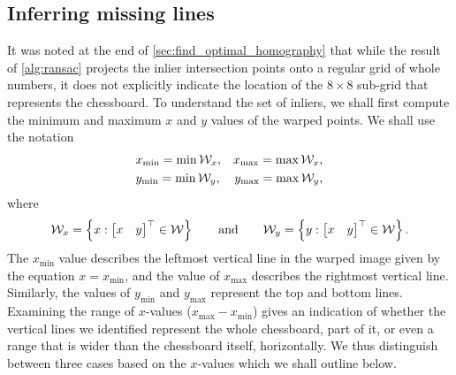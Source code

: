 \documentclass[../main.tex]{subfiles}
\begin{document}
\subsection{Inferring missing lines}
\label{sec:infer_missing_lines}
It was noted at the end of \cref{sec:find_optimal_homography} that while the result of \cref{alg:ransac} projects the inlier intersection points onto a regular grid of whole numbers, it does not explicitly indicate the location of the $8\times 8$ sub-grid that represents the chessboard.
To understand the set of inliers, we shall first compute the minimum and maximum $x$ and $y$ values of the warped points.
We shall use the notation
\begin{align}
    &x_\text{min} = \min {\mathcal{W}}_x,
    &x_\text{max} = \max {\mathcal{W}}_x,\label{eq:infer_lines_x_extrema}\\
    &y_\text{min} = \min {\mathcal{W}}_y,
    &y_\text{max} = \max {\mathcal{W}}_y,
\end{align}
where
\begin{equation}
    \sW_x = \left\{ x : \begin{bmatrix}
        x & y
    \end{bmatrix}^\top \in \sW \right\}%
    \qquad \text{and} \qquad%
    \sW_y = \left\{ y : \begin{bmatrix}
        x & y
    \end{bmatrix}^\top \in \sW \right\}.
\end{equation}
The $x_\text{min}$ value describes the leftmost vertical line in the warped image given by the equation $x=x_\text{min}$, and the value of $x_\text{max}$ describes the rightmost vertical line. 
Similarly, the values of $y_\text{min}$ and $y_\text{max}$ represent the top and bottom lines.
Examining the range of $x$-values ($x_\text{max}-x_\text{min}$) gives an indication of whether the vertical lines we identified represent the whole chessboard, part of it, or even a range that is wider than the chessboard itself, horizontally.
We thus distinguish between three cases based on the $x$-values which we shall outline below. 
\end{document}
